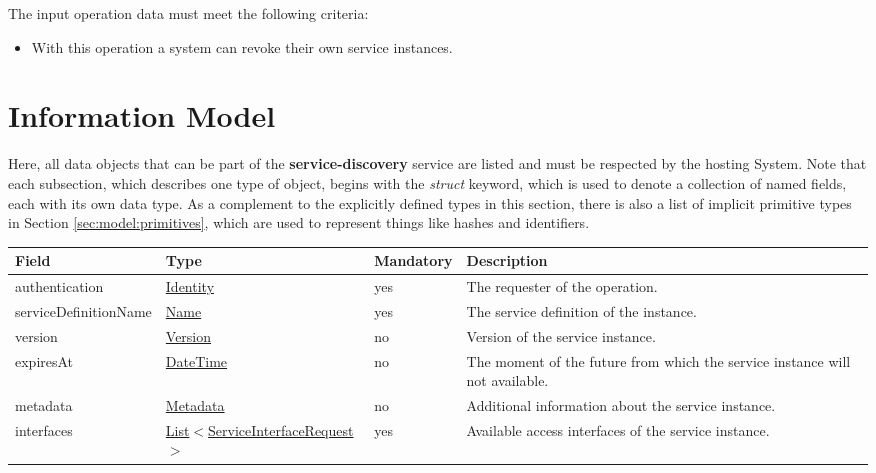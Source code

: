 \documentclass[a4paper]{arrowhead}
\newcommand{\pref}[1]{{\textcolor{ArrowheadGrey}{\hyperref[sec:model:primitives:#1]{#1}}}}
\begin{document}

The input operation data must meet the following criteria:

\begin{itemize}
    \item With this operation a system can revoke their own service instances.
\end{itemize}

\clearpage

\section{Information Model}
\label{sec:model}

Here, all data objects that can be part of the \textbf{service-discovery} service are listed and must be respected by the hosting System.
Note that each subsection, which describes one type of object, begins with the \textit{struct} keyword, which is used to denote a collection of named fields, each with its own data type.
As a complement to the explicitly defined types in this section, there is also a list of implicit primitive types in Section \ref{sec:model:primitives}, which are used to represent things like hashes and identifiers.

\label{sec:model:ServiceRegistrationRequest}
 
\begin{table}[ht!]
\begin{tabularx}{\textwidth}{| p{3.5cm} | p{4.7cm} | p{2cm} | X |} \hline
\rowcolor{gray!33} Field & Type & Mandatory & Description \\ \hline
authentication & \hyperref[sec:model:Identity]{Identity} & yes & The requester of the operation. \\ \hline
serviceDefinitionName & \pref{Name} & yes & The service definition of the instance. \\ \hline
version & \pref{Version} & no & Version of the service instance. \\ \hline
expiresAt & \pref{DateTime} & no & The moment of the future from which the service instance will not available. \\ \hline
metadata &\hyperref[sec:model:Metadata]{Metadata} & no & Additional information about the service instance. \\ \hline
interfaces &  \pref{List}$<$\hyperref[sec:model:ServiceInterfaceRequest]{ServiceInterfaceRequest}$>$ & yes & Available access interfaces of the service instance.  \\ \hline
\end{tabularx}
\end{table}
\end{document}
